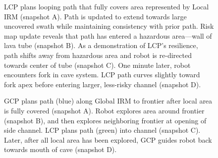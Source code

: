 \documentclass[letterpaper]{article} %
\begin{document}
\begin{figure}[h!]
\centering
\caption{LCP plans looping path that fully covers area represented by Local IRM (snapshot A). Path is updated to extend towards large uncovered swath while maintaining consistency with prior path. Risk map update reveals that path has entered a hazardous area---wall of lava tube (snapshot B). As a demonstration of LCP's resilience, path shifts away from hazardous area and robot is re-directed towards center of tube (snapshot C). One minute later, robot encounters fork in cave system. LCP path curves slightly toward fork apex before entering larger, less-risky channel (snapshot D). } \label{fig:mlp_hardware_tests} 
\end{figure}

\begin{figure}[h!]
\centering
\caption{GCP plans path (blue) along Global IRM to frontier after local area is fully covered (snapshot A). Robot explores area around frontier (snapshot B), and then explores neighboring frontier at opening of side channel. LCP plans path (green) into channel (snapshot C). Later, after all local area has been explored, GCP guides robot back towards mouth of cave (snapshot D).} \label{fig:glp_hardware_tests} 
\end{figure}
\end{document}
